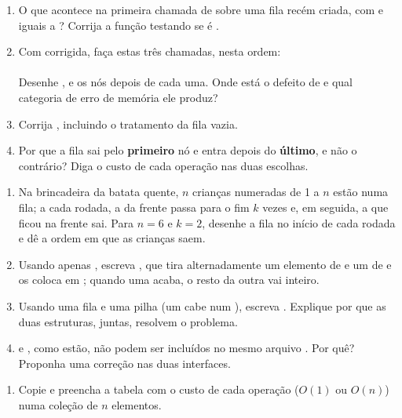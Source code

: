 \documentclass[11pt,a4paper]{article}
\begin{document}
\begin{enumerate}[label=(\alph*),leftmargin=1.8em,itemsep=1pt]
  \item O que acontece na primeira chamada de  sobre uma fila recém
        criada, com  e  iguais a ? Corrija a função
        testando se  é .
  \item Com  corrigida, faça estas três chamadas, nesta ordem:\\
         \quad {} \quad {}\\
        Desenhe ,  e os nós depois de cada uma. Onde está o defeito de  e qual
        categoria de erro de memória ele produz?
  \item Corrija , incluindo o tratamento da fila vazia.
  \item Por que a fila sai pelo \textbf{primeiro} nó e entra depois do
        \textbf{último}, e não o contrário? Diga o custo de cada operação nas duas
        escolhas.
\end{enumerate}

\begin{enumerate}[label=(\alph*),leftmargin=1.8em,itemsep=1pt]
  \item Na brincadeira da batata quente, $n$ crianças numeradas de 1 a $n$ estão
        numa fila; a cada rodada, a da frente passa para o fim $k$ vezes e, em
        seguida, a que ficou na frente sai. Para $n = 6$ e $k = 2$, desenhe a fila
        no início de cada rodada e dê a ordem em que as crianças saem.
  \item Usando apenas , escreva
        , que tira alternadamente
        um elemento de  e um de  e os coloca em ; quando uma
        acaba, o resto da outra vai inteiro.
  \item Usando uma fila e uma pilha (um  cabe num ), escreva
        . Explique por que as duas estruturas,
        juntas, resolvem o problema.
  \item {} e , como estão, não podem ser incluídos no mesmo
        arquivo . Por quê? Proponha uma correção nas duas interfaces.
\end{enumerate}

\begin{enumerate}[label=(\alph*),leftmargin=1.8em,itemsep=1pt]
  \item Copie e preencha a tabela com o custo de cada operação ($O(1)$ ou $O(n)$)
        numa coleção de $n$ elementos.
\end{enumerate}
\end{document}
